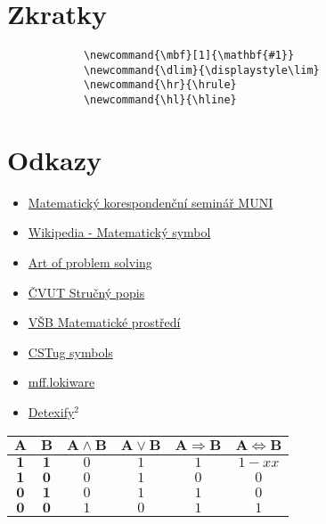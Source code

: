\documentclass{article}
\newcommand{\hl}{\hline}
\newcommand{\dlim}{\displaystyle\lim}
\newcommand{\mbf}[1]{\mathbf{#1}}
\begin{document}
\begin{multicols}{2}
	\columnbreak

		\section*{Zkratky}
		\begin{verbatim}
			\newcommand{\mbf}[1]{\mathbf{#1}}
			\newcommand{\dlim}{\displaystyle\lim}
			\newcommand{\hr}{\hrule}
			\newcommand{\hl}{\hline}
		\end{verbatim}

		\section*{Odkazy}
		\begin{itemize}
			\item \href{http://mks.mff.cuni.cz/info/tex/psani.php}{Matematický korespondenční seminář MUNI}
			\item \href{http://cs.wikipedia.org/wiki/Matematický_symbol}{Wikipedia - Matematický symbol}
			\item \href{http://www.artofproblemsolving.com/Wiki/index.php/LaTeX:Symbols}{Art of problem solving}
			\item \href{http://mat.fsv.cvut.cz/konickova/navody/ltxstruc.pdf}{ČVUT Stručný popis}
			\item \href{http://www.cs.vsb.cz/benes/vyuka/latex/math.htm}{VŠB Matematické prostředí}
			\item \href{http://ftp.cstug.cz/pub/tex/CTAN/info/symbols/comprehensive/symbols-letter.pdf}{CSTug symbols}
			\item \href{http://mff.lokiware.info/LaTeX}{mff.lokiware}
			\item \href{http://detexify.kirelabs.org/classify.html}{Detexify$^2$}
		\end{itemize}

		\begin{tabular}{cc|cccc}
				$\mbf{A}$	&	$\mbf{B}$	&	$\mbf{A \wedge B}$	&	$\mbf{A \vee B}$	&	$\mbf{A \Rightarrow B}$	&	$\mbf{A \Leftrightarrow B}$	\\\hline
				$\mbf{1}$	&	$\mbf{1}$	&	$0$						&	$1$					&	$1$							&	$1-x	x$								\\
				$\mbf{1}$	&	$\mbf{0}$	&	$0$						&	$1$					&	$0$							&	$0$											\\
				$\mbf{0}$	&	$\mbf{1}$	&	$0$						&	$1$					&	$1$							&	$0$											\\
				$\mbf{0}$	&	$\mbf{0}$	&	$1$						&	$0$					&	$1$							&	$1$											\\
			\end{tabular}

	\end{multicols}
\end{document}

